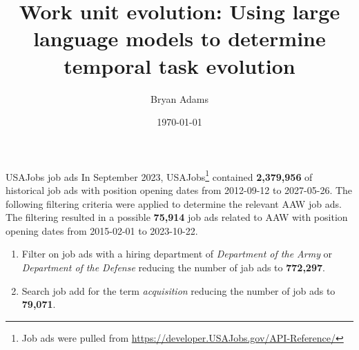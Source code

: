 \documentclass{beamer}
\title{Work unit evolution: Using large language models to determine temporal task evolution}
\author{Bryan Adams}
\institute{George Mason University}
\date{\today}
\begin{document}
\begin{frame}
  \titlepage
\end{frame}


\begin{frame}{USAJobs job ads}
  In September 2023, USAJobs\footnote{Job ads were pulled from \href{https://developer.USAJobs.gov/API-Reference/}{https://developer.USAJobs.gov/API-Reference/}} contained \textbf{2,379,956 }of historical job ads with position opening dates from 2012-09-12 to 2027-05-26. The following filtering criteria were applied to determine the relevant AAW job ads. The filtering resulted in a possible \textbf{75,914} job ads related to AAW with position opening dates from 2015-02-01 to 2023-10-22.

  \begin{enumerate}
    \item Filter on job ads with a hiring department of \textit{Department of the Army} or \textit{Department of the Defense} reducing the number of jab ads to \textbf{772,297}.
    \item Search job add for the term \textit{acquisition} reducing the number of job ads to \textbf{79,071}.
  \end{enumerate}

\end{frame}
\end{document}
